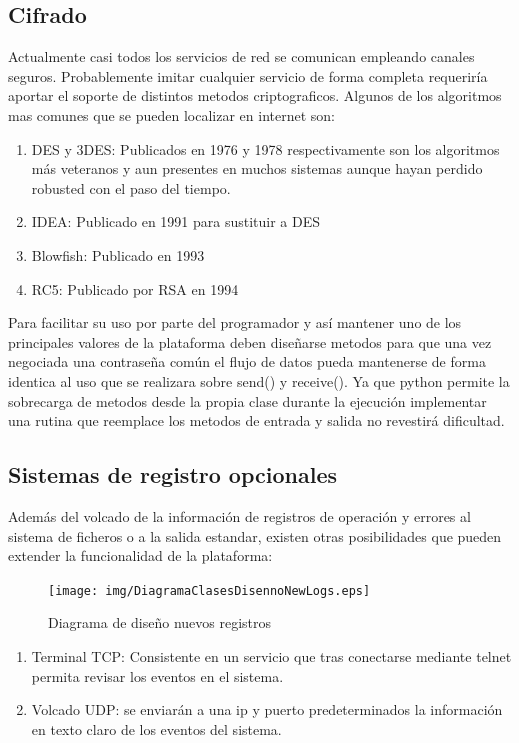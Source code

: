 \documentclass[a4paper,spanish,12pt]{book}
\begin{document}
\subsection{Cifrado}
Actualmente casi todos los servicios de red se comunican empleando canales seguros. Probablemente imitar cualquier servicio de forma completa requeriría aportar el soporte de distintos metodos criptograficos. Algunos de los algoritmos mas comunes que se pueden localizar en internet son:
\begin{enumerate}
	\item{DES y 3DES: Publicados en 1976 y 1978 respectivamente son los algoritmos más veteranos y aun presentes en muchos sistemas aunque hayan perdido robusted con el paso del tiempo.}
	\item{IDEA: Publicado en 1991 para sustituir a DES}
	\item{Blowfish: Publicado en 1993}
	\item{RC5: Publicado por RSA en 1994}
\end{enumerate}
Para facilitar su uso por parte del programador y así mantener uno de los principales valores de la plataforma deben diseñarse metodos para que una vez negociada una contraseña común el flujo de datos pueda mantenerse de forma identica al uso que se realizara sobre send() y receive(). Ya que python permite la sobrecarga de metodos desde la propia clase durante la ejecución implementar una rutina que reemplace los metodos de entrada y salida no revestirá dificultad.

\subsection{Sistemas de registro opcionales}
Además del volcado de la información de registros de operación y errores al sistema de ficheros o a la salida estandar, existen otras posibilidades que pueden extender la funcionalidad de la plataforma:
\begin{figure}[h] %
	\texttt{[image: img/DiagramaClasesDisennoNewLogs.eps]}	
              \caption{Diagrama de diseño nuevos registros}
  \label{fig:DiagramaClasesDisennoNewLog}
\end{figure}

\begin{enumerate}
	\item{Terminal TCP: Consistente en un servicio que tras conectarse mediante telnet permita revisar los eventos en el sistema.}
	\item{Volcado UDP: se enviarán a una ip y puerto predeterminados la información en texto claro de los eventos del sistema.}
\end{enumerate}
\end{document}
